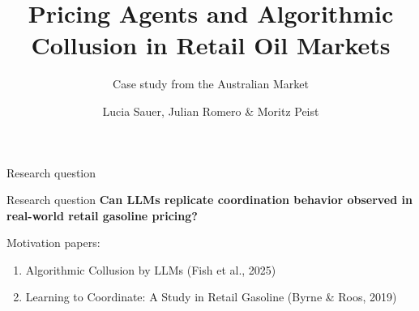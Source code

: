 \documentclass[10pt]{beamer}
\title{Pricing Agents and Algorithmic Collusion in Retail Oil Markets}
\subtitle{Case study from the Australian Market}
\date{}
\author{Lucia Sauer, Julian Romero \& Moritz Peist }
\institute{Barcelona School of Economics}
\begin{document}
\maketitle


\begin{frame}{Research question}
    \begin{alertblock}{Research question}
        \centering
        \textbf{Can LLMs replicate coordination behavior observed in real-world retail gasoline pricing?}
    \end{alertblock}
    \bigskip
    Motivation papers:
    \begin{enumerate}
        \item Algorithmic Collusion by LLMs (Fish et al., 2025)
        \item Learning to Coordinate: A Study in Retail Gasoline (Byrne \& Roos, 2019)
    \end{enumerate}
\end{frame}
\end{document}
